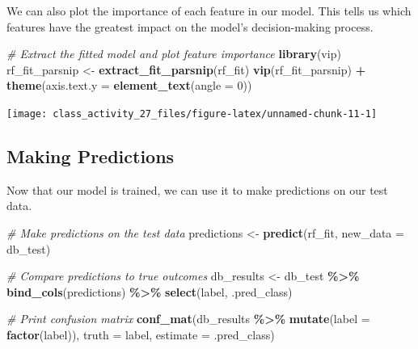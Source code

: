 \documentclass[
]{book}
\newenvironment{Shaded}{\begin{snugshade}}{\end{snugshade}}
\newcommand{\AttributeTok}[1]{\textcolor[rgb]{0.13,0.29,0.53}{#1}}
\newcommand{\CommentTok}[1]{\textcolor[rgb]{0.56,0.35,0.01}{\textit{#1}}}
\newcommand{\DecValTok}[1]{\textcolor[rgb]{0.00,0.00,0.81}{#1}}
\newcommand{\FunctionTok}[1]{\textcolor[rgb]{0.13,0.29,0.53}{\textbf{#1}}}
\newcommand{\NormalTok}[1]{#1}
\newcommand{\OtherTok}[1]{\textcolor[rgb]{0.56,0.35,0.01}{#1}}
\newcommand{\SpecialCharTok}[1]{\textcolor[rgb]{0.81,0.36,0.00}{\textbf{#1}}}
\begin{document}
We can also plot the importance of each feature in our model. This tells us which features have the greatest impact on the model's decision-making process.

\begin{Shaded}
\begin{Highlighting}[]
\CommentTok{\# Extract the fitted model and plot feature importance}
\FunctionTok{library}\NormalTok{(vip)}
\NormalTok{rf\_fit\_parsnip }\OtherTok{\textless{}{-}} \FunctionTok{extract\_fit\_parsnip}\NormalTok{(rf\_fit)}
\FunctionTok{vip}\NormalTok{(rf\_fit\_parsnip) }\SpecialCharTok{+} \FunctionTok{theme}\NormalTok{(}\AttributeTok{axis.text.y =} \FunctionTok{element\_text}\NormalTok{(}\AttributeTok{angle =} \DecValTok{0}\NormalTok{))}
\end{Highlighting}
\end{Shaded}

\texttt{[image: class\_activity\_27\_files/figure-latex/unnamed-chunk-11-1]}

\hypertarget{making-predictions}{%
\subsection{Making Predictions}\label{making-predictions}}

Now that our model is trained, we can use it to make predictions on our test data.

\begin{Shaded}
\begin{Highlighting}[]
\CommentTok{\# Make predictions on the test data}
\NormalTok{predictions }\OtherTok{\textless{}{-}} \FunctionTok{predict}\NormalTok{(rf\_fit, }\AttributeTok{new\_data =}\NormalTok{ db\_test)}

\CommentTok{\# Compare predictions to true outcomes}
\NormalTok{db\_results }\OtherTok{\textless{}{-}}\NormalTok{ db\_test }\SpecialCharTok{\%\textgreater{}\%} \FunctionTok{bind\_cols}\NormalTok{(predictions) }\SpecialCharTok{\%\textgreater{}\%} \FunctionTok{select}\NormalTok{(label, .pred\_class)}

\CommentTok{\# Print confusion matrix}
\FunctionTok{conf\_mat}\NormalTok{(db\_results }\SpecialCharTok{\%\textgreater{}\%} \FunctionTok{mutate}\NormalTok{(}\AttributeTok{label =} \FunctionTok{factor}\NormalTok{(label)), }\AttributeTok{truth =}\NormalTok{ label, }\AttributeTok{estimate =}\NormalTok{ .pred\_class)}
\end{Highlighting}
\end{Shaded}
\end{document}
